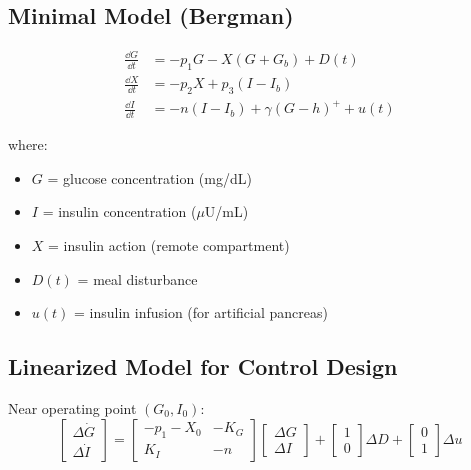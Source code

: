 

\subsection{Minimal Model (Bergman)}

\begin{align}
\frac{\dd G}{\dd t} &= -p_1 G - X(G + G_b) + D(t) \\
\frac{\dd X}{\dd t} &= -p_2 X + p_3(I - I_b) \\
\frac{\dd I}{\dd t} &= -n(I - I_b) + \gamma(G - h)^+ + u(t)
\end{align}

where:
\begin{itemize}
    \item $G$ = glucose concentration (mg/dL)
    \item $I$ = insulin concentration ($\mu$U/mL)
    \item $X$ = insulin action (remote compartment)
    \item $D(t)$ = meal disturbance
    \item $u(t)$ = insulin infusion (for artificial pancreas)
\end{itemize}

\subsection{Linearized Model for Control Design}

Near operating point $(G_0, I_0)$:
\begin{equation}
\begin{bmatrix} \Delta\dot{G} \\ \Delta\dot{I} \end{bmatrix} =
\begin{bmatrix} -p_1 - X_0 & -K_G \\ K_I & -n \end{bmatrix}
\begin{bmatrix} \Delta G \\ \Delta I \end{bmatrix} +
\begin{bmatrix} 1 \\ 0 \end{bmatrix} \Delta D +
\begin{bmatrix} 0 \\ 1 \end{bmatrix} \Delta u
\end{equation}


